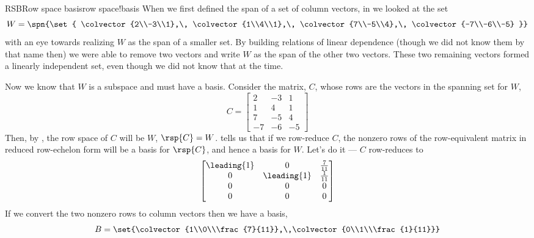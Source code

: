 %
\begin{example}{RSB}{Row space basis}{row space!basis}
When we first defined the span of a set of column vectors, in  we looked at the set
%
\begin{equation*}
W=\spn{\set{
\colvector{2\\-3\\1},\,
\colvector{1\\4\\1},\,
\colvector{7\\-5\\4},\,
\colvector{-7\\-6\\-5}
}}
\end{equation*}
%
with an eye towards realizing $W$ as the span of a smaller set.  By building relations of linear dependence (though we did not know them by that name then) we were able to remove two vectors and write $W$ as the span of the other two vectors.  These two remaining vectors formed a linearly independent set, even though we did not know that at the time.\par
%
Now we know that $W$ is a subspace and must have a basis.  Consider the matrix, $C$, whose rows are the vectors in the spanning set for $W$,
%
\begin{equation*}
C=\begin{bmatrix}
2 & -3 & 1\\
1 & 4 & 1\\
7 & -5 & 4\\
-7 & -6 & -5
\end{bmatrix}
\end{equation*}
%
Then, by , the row space of $C$ will be $W$, $\rsp{C}=W$.
 tells us that if we row-reduce $C$, the nonzero rows of the row-equivalent matrix in reduced row-echelon form will be a basis for $\rsp{C}$, and hence a basis for $W$.  Let's do it --- $C$ row-reduces to
%
\begin{equation*}
\begin{bmatrix}
\leading{1} & 0 & \frac{7}{11}\\
0 & \leading{1} & \frac{1}{11}\\
0 & 0 & 0\\
0 & 0 & 0
\end{bmatrix}
\end{equation*}
%
If we convert the two nonzero rows to column vectors then we have a basis,
%
\begin{equation*}
B=\set{\colvector{1\\0\\\frac{7}{11}},\,\colvector{0\\1\\\frac{1}{11}}}

\end{equation*}
\end{example}
